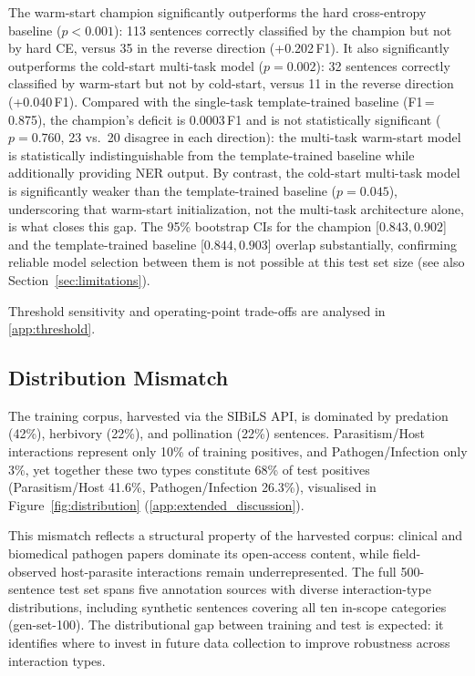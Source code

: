 \documentclass[a4paper,fleqn]{cas-sc}
\begin{document}
The warm-start champion significantly outperforms the hard cross-entropy
baseline ($p{<}0.001$): 113 sentences correctly classified by the champion
but not by hard CE, versus 35 in the reverse direction (+0.202\,F1).
It also significantly outperforms the cold-start multi-task model
($p{=}0.002$): 32 sentences correctly classified by warm-start
but not by cold-start, versus 11 in the reverse direction (+0.040\,F1).
Compared with the single-task template-trained baseline (F1\,=\,0.875),
the champion's deficit is 0.0003\,F1 and is not statistically significant
($p = 0.760$, 23 vs.\ 20 disagree in each direction): the multi-task warm-start model
is statistically indistinguishable from the template-trained baseline while
additionally providing NER output. By contrast, the cold-start multi-task
model is significantly weaker than the template-trained baseline
($p{=}0.045$), underscoring that warm-start initialization, not the
multi-task architecture alone, is what closes this gap.
The 95\% bootstrap CIs for the champion [$0.843, 0.902$] and the
template-trained baseline [$0.844, 0.903$] overlap substantially, confirming
reliable model selection between them is not possible at this test set size
(see also Section~\ref{sec:limitations}).

Threshold sensitivity and operating-point trade-offs are analysed in
\ref{app:threshold}.

\subsection{Distribution Mismatch}

The training corpus, harvested via the SIBiLS API,
is dominated by predation (42\%), herbivory (22\%), and pollination (22\%)
sentences.
Parasitism/Host interactions represent only 10\% of training positives, and
Pathogen/Infection only 3\%, yet together these two types constitute 68\%
of test positives (Parasitism/Host 41.6\%, Pathogen/Infection 26.3\%),
visualised in Figure~\ref{fig:distribution} (\ref{app:extended_discussion}).

This mismatch reflects a structural property of the harvested corpus:
clinical and biomedical pathogen papers dominate its open-access content,
while field-observed host-parasite interactions remain underrepresented.
The full 500-sentence test set spans five annotation sources
with diverse interaction-type distributions, including synthetic sentences
covering all ten in-scope categories (gen-set-100). The distributional gap
between training and test is expected: it identifies where to invest in
future data collection to improve robustness across interaction types.
\end{document}
